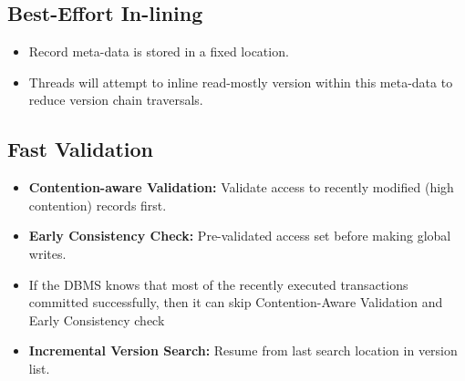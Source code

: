 \documentclass[11pt]{article}
\begin{document}
\subsection*{Best-Effort In-lining}
\begin{itemize}
    \item
    Record meta-data is stored in a fixed location.
    
    \item
    Threads will attempt to inline read-mostly version within this meta-data to reduce 
    version chain traversals.
\end{itemize}

\subsection*{Fast Validation}
\begin{itemize}
    \item \textbf{Contention-aware Validation:}
    Validate access to recently modified (high contention) records first.
    
    \item \textbf{Early Consistency Check:}
    Pre-validated access set before making global writes.
    
    \item If the DBMS knows that most of the recently executed transactions committed successfully,
    then it can skip Contention-Aware Validation and Early Consistency check
    
    \item \textbf{Incremental Version Search:}
    Resume from last search location in version list.
\end{itemize}


\newpage


\end{document}
